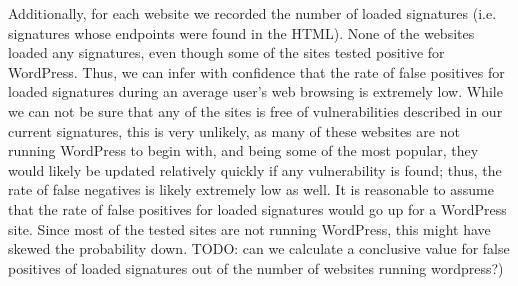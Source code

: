 Additionally, for each website we recorded the number of loaded signatures (i.e. signatures whose endpoints were found in the HTML). None of the websites loaded any signatures, even though some of the sites tested positive for WordPress. Thus, we can infer with confidence that the rate of false positives for loaded signatures during an average user's web browsing is extremely low. While we can not be sure that any of the sites is free of vulnerabilities described in our current signatures, this is very unlikely, as many of these websites are not running WordPress to begin with, and being some of the most popular, they would likely be updated relatively quickly if any vulnerability is found; thus, the rate of false negatives is likely extremely low as well. It is reasonable to assume that the rate of false positives for loaded signatures would go up for a WordPress site. Since most of the tested sites are not running WordPress, this might have skewed the probability down. TODO: can we calculate a conclusive value for false positives of loaded signatures out of the number of websites running wordpress?)



